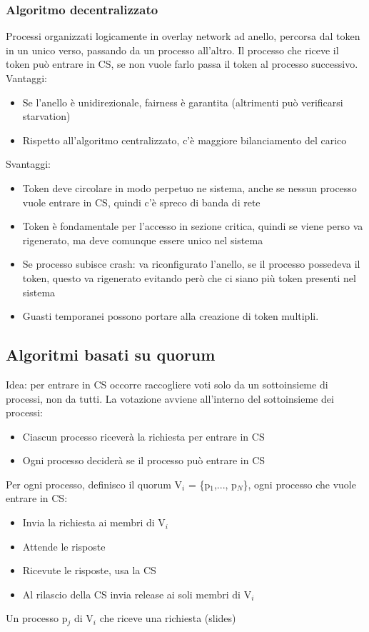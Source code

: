 \documentclass{article}
\begin{document}
\subsubsection{Algoritmo decentralizzato}
Processi organizzati logicamente in overlay network ad anello, percorsa dal token in un unico verso, passando da un processo all'altro. Il processo che riceve il token può entrare in CS, se non vuole farlo passa il token al processo successivo. Vantaggi:
\begin{itemize}
\item Se l'anello è unidirezionale, fairness è garantita (altrimenti può verificarsi starvation)
\item Rispetto all'algoritmo centralizzato, c'è maggiore bilanciamento del carico
\end{itemize}
Svantaggi:
\begin{itemize}
\item Token deve circolare in modo perpetuo ne sistema, anche se nessun processo vuole entrare in CS, quindi c'è spreco di banda di rete
\item Token è fondamentale per l'accesso in sezione critica, quindi se viene perso va rigenerato, ma deve comunque essere unico nel sistema
\item Se processo subisce crash: va riconfigurato l'anello, se il processo possedeva il token, questo va rigenerato evitando però che ci siano più token presenti nel sistema
\item Guasti temporanei possono portare alla creazione di token multipli.
\end{itemize}
\subsection{Algoritmi basati su quorum}
Idea: per entrare in CS occorre raccogliere voti solo da un sottoinsieme di processi, non da tutti. La votazione avviene all'interno del sottoinsieme dei processi:
\begin{itemize}
\item Ciascun processo riceverà la richiesta per entrare in CS
\item Ogni processo deciderà se il processo può entrare in CS
\end{itemize}
Per ogni processo, definisco il quorum V$_i$ = \{p$_1$,..., p$_N$\}, ogni processo che vuole entrare in CS:
\begin{itemize}
\item Invia la richiesta ai membri di V$_i$
\item Attende le risposte
\item Ricevute le risposte, usa la CS
\item Al rilascio della CS  invia release ai soli membri di V$_i$
\end{itemize}
Un processo p$_j$ di V$_i$ che riceve una richiesta (slides)
\end{document}
